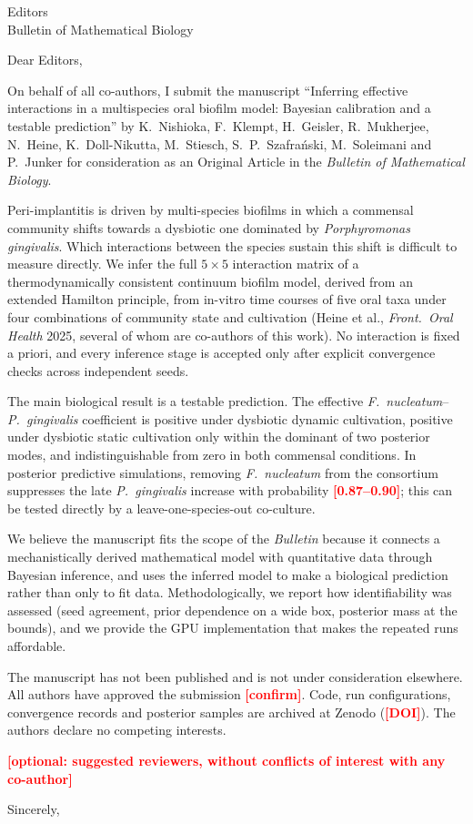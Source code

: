 \documentclass[11pt,a4paper]{letter}
\date{\TBD{date}}
\newcommand{\TBD}[1]{\textcolor{red}{\textbf{[#1]}}}
\begin{document}
\begin{letter}{Editors\\Bulletin of Mathematical Biology}

\opening{Dear Editors,}

On behalf of all co-authors, I submit the manuscript
``Inferring effective interactions in a multispecies oral biofilm model: Bayesian calibration and a testable prediction''
by K.~Nishioka, F.~Klempt, H.~Geisler, R.~Mukherjee, N.~Heine, K.~Doll-Nikutta, M.~Stiesch, S.~P.~Szafra\'{n}ski, M.~Soleimani and P.~Junker
for consideration as an Original Article in the \emph{Bulletin of Mathematical Biology}.

Peri-implantitis is driven by multi-species biofilms in which a commensal community shifts towards a dysbiotic one dominated by \emph{Porphyromonas gingivalis}.
Which interactions between the species sustain this shift is difficult to measure directly.
We infer the full $5\times5$ interaction matrix of a thermodynamically consistent continuum biofilm model, derived from an extended Hamilton principle, from in-vitro time courses of five oral taxa under four combinations of community state and cultivation (Heine et al., \emph{Front.\ Oral Health} 2025, several of whom are co-authors of this work).
No interaction is fixed a priori, and every inference stage is accepted only after explicit convergence checks across independent seeds.

The main biological result is a testable prediction.
The effective \emph{F.~nucleatum}--\emph{P.~gingivalis} coefficient is positive under dysbiotic dynamic cultivation, positive under dysbiotic static cultivation only within the dominant of two posterior modes, and indistinguishable from zero in both commensal conditions.
In posterior predictive simulations, removing \emph{F.~nucleatum} from the consortium suppresses the late \emph{P.~gingivalis} increase with probability \TBD{0.87--0.90}; this can be tested directly by a leave-one-species-out co-culture.

We believe the manuscript fits the scope of the \emph{Bulletin} because it connects a mechanistically derived mathematical model with quantitative data through Bayesian inference, and uses the inferred model to make a biological prediction rather than only to fit data.
Methodologically, we report how identifiability was assessed (seed agreement, prior dependence on a wide box, posterior mass at the bounds), and we provide the GPU implementation that makes the repeated runs affordable.

The manuscript has not been published and is not under consideration elsewhere.
All authors have approved the submission \TBD{confirm}.
Code, run configurations, convergence records and posterior samples are archived at Zenodo (\TBD{DOI}).
The authors declare no competing interests.

\TBD{optional: suggested reviewers, without conflicts of interest with any co-author}

\closing{Sincerely,}

\end{letter}
\end{document}
